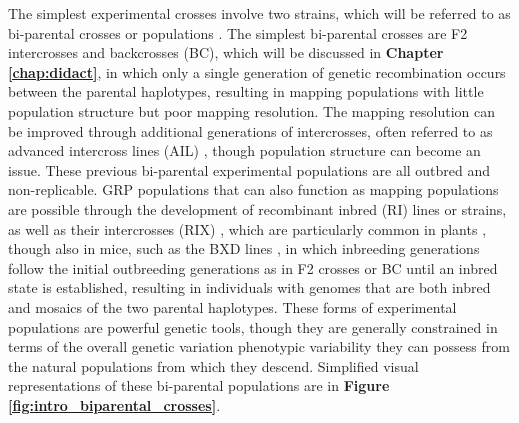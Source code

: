 The simplest experimental crosses involve two strains, which will be referred to as bi-parental crosses or populations \citep{Broman2001}. The simplest bi-parental crosses are F2 intercrosses and backcrosses (BC), which will be discussed in \textbf{Chapter \ref{chap:didact}}, in which only a single generation of genetic recombination occurs between the parental haplotypes, resulting in mapping populations with little population structure but poor mapping resolution. The mapping resolution can be improved through additional generations of intercrosses, often referred to as advanced intercross lines (AIL) \citep{Darvasi1995,Parker2011a,Parker2012,Parker2014}, though population structure can become an issue. These previous bi-parental experimental populations are all outbred and non-replicable. GRP populations that can also function as mapping populations are possible through the development of recombinant inbred (RI) lines or strains, as well as their intercrosses (RIX) \citep{Zou2005}, which are particularly common in plants \citep{Lister1993, Mansur1996, Monforte2000}, though also in mice, such as the BXD lines \citep{Peirce2004,Carbonetto2014}, in which inbreeding generations follow the initial outbreeding generations as in F2 crosses or BC until an inbred state is established, resulting in individuals with genomes that are both inbred and mosaics of the two parental haplotypes. These forms of experimental populations are powerful genetic tools, though they are generally constrained in terms of the overall genetic variation phenotypic variability they can possess from the natural populations from which they descend. Simplified visual representations of these bi-parental populations are in \textbf{Figure \ref{fig:intro_biparental_crosses}}.

